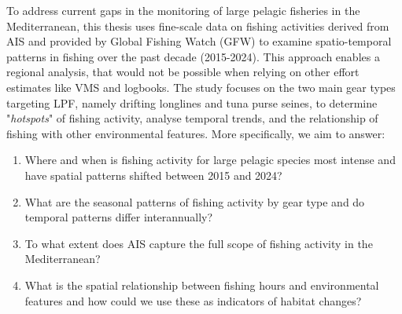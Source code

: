 \medskip

To address current gaps in the monitoring of large pelagic fisheries in the Mediterranean, this thesis uses fine-scale data on fishing activities derived from AIS and provided by Global Fishing
Watch (GFW) to examine spatio-temporal patterns in fishing over the past decade (2015-2024). This approach enables a regional analysis, that would not be possible when relying on other
effort estimates like VMS and logbooks. The study focuses on the two main gear types targeting LPF, namely drifting longlines and tuna purse seines, to determine "\textit{hotspots}" of fishing
activity, analyse temporal trends, and the relationship of fishing with other environmental features. More specifically, we aim to answer: 
\begin{enumerate}
    \item Where and when is fishing activity for large pelagic species most intense and have spatial patterns shifted between 2015 and 2024?
    \item What are the seasonal patterns of fishing activity by gear type and do temporal patterns differ interannually?
    \item To what extent does AIS capture the full scope of fishing activity in the Mediterranean?
    \item What is the spatial relationship between fishing hours and environmental features and how could we use these as indicators of habitat changes?
\end{enumerate}